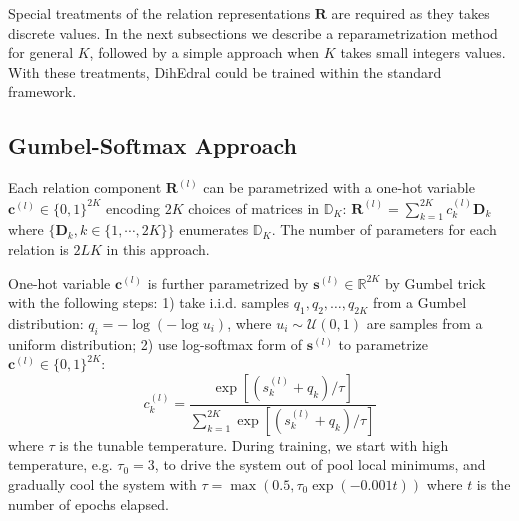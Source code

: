 \documentclass[11pt,a4paper]{article}
\begin{document}
Special treatments of  the relation representations $\bm{R}$ are required as they takes discrete values. In the next subsections we describe a reparametrization method for general $K$, followed by a simple approach when $K$ takes small integers values. With these treatments, DihEdral could be trained within the standard framework.

\subsection{Gumbel-Softmax Approach}

Each relation component $\bm{R}^{(l)}$ can be parametrized with a one-hot variable $\bm{c}^{(l)}\in \{0,1\}^{2K}$ encoding $2K$ choices of matrices in $\mathbb{D}_K$:
$    \bm{R}^{(l)} = \sum_{k=1}^{2K} c^{(l)}_{k}\bm{D}_k$
where $\{\bm{D}_k, k\in\{1,\cdots,2K\}\}$ enumerates $\mathbb{D}_K$. The number of parameters for each relation is $2LK$ in this approach.



One-hot variable $\bm{c}^{(l)}$ is further parametrized by  $\bm{s}^{(l)} \in \mathbb{R}^{2K}$ by Gumbel trick \cite{gumbel-softmax} with the following steps: 1) take i.i.d. samples $q_1, q_2, \dots, q_{2K}$ from a Gumbel distribution: $q_i = -\log(-\log u_i)$, where $u_i \sim \mathcal{U}(0, 1)$ are samples from a uniform distribution; 2) use log-softmax form of $\bm{s}^{(l)}$ to parametrize $\bm{c}^{(l)}\in \{0,1\}^{2K}$:
\begin{equation} \label{eq: gumbel}
    c^{(l)}_k = \frac{\exp\left[(s^{(l)}_k + q_k) / \tau\right]}{\sum_{k=1}^{2K} \exp\left[(s^{(l)}_k + q_k) / \tau\right]}
\end{equation}
where $\tau$ is the tunable temperature. During training, we start with high temperature, e.g. $\tau_0=3$, to drive the system out of pool local minimums, and gradually cool the system with $\tau=\max(0.5, \tau_0\exp(-0.001 t))$ where $t$ is the number of epochs elapsed. 
\end{document}
